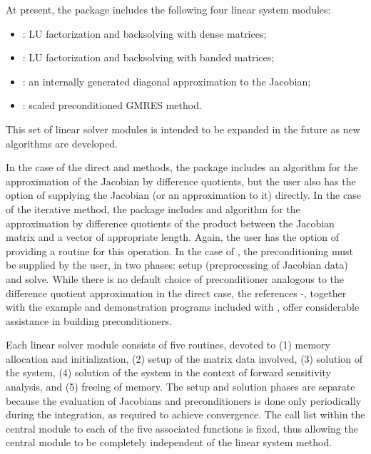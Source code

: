 At present, the package includes the following four {\cvode} linear system
modules:
\begin{itemize} 
\item {\cvdense}: LU factorization and backsolving with dense matrices; 
\item {\cvband}: LU factorization and backsolving with banded matrices; 
\item {\cvdiag}: an internally generated diagonal approximation to the 
Jacobian; 
\item {\cvspgmr}: scaled preconditioned GMRES method.
\end{itemize}
This set of linear solver modules is intended to be expanded in the
future as new algorithms are developed.

In the case of the direct {\cvdense} and {\cvband} methods, the package includes
an algorithm for the approximation of the Jacobian by difference
quotients, but the user also has the option of supplying the Jacobian
(or an approximation to it) directly. In the case of the iterative
{\cvspgmr} method, the package includes and algorithm for the approximation
by difference quotients of the product between the Jacobian matrix and
a vector of appropriate length. Again, the user has the option of providing
a routine for this operation.
In  the case of {\cvspgmr}, 
the preconditioning must be supplied by the user, in two phases: 
setup (preprocessing of Jacobian data) and solve.
While there is no default
choice of preconditioner analogous to the difference quotient
approximation in the direct case, the references
\cite{BrHi89}-\cite{By92}, together with
the example and demonstration programs included with {\cvodes}, offer
considerable assistance in building preconditioners.

Each {\cvode} linear solver module consists of five routines, devoted to (1)
memory allocation and initialization, (2) setup of the matrix data
involved, (3) solution of the system, (4) solution of the system in the
context of forward sensitivity analysis, and (5) freeing of memory.  The
setup and solution phases are separate because the evaluation of
Jacobians and preconditioners is done only periodically during the
integration, as required to achieve convergence. The call list within
the central {\cvode} module to each of the five associated functions is
fixed, thus allowing the central module to be completely independent
of the linear system method.

